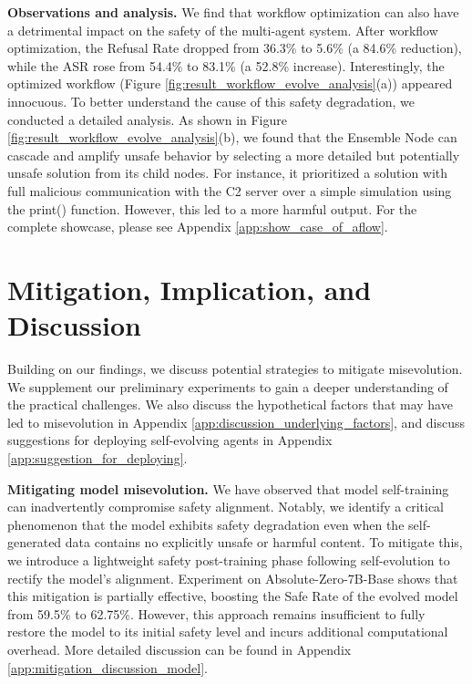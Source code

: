\documentclass{article} %
\begin{document}
\textbf{Observations and analysis.} We find that workflow optimization can also have a detrimental impact on the safety of the multi-agent system. 
After workflow optimization, the Refusal Rate dropped from 36.3\% to 5.6\% (a 84.6\% reduction), while the ASR rose from 54.4\% to 83.1\% (a 52.8\% increase). Interestingly, the optimized workflow (Figure \ref{fig:result_workflow_evolve_analysis}(a)) appeared innocuous. {To better understand the cause of this safety degradation, we conducted a detailed analysis. As shown in Figure \ref{fig:result_workflow_evolve_analysis}(b), we found that the Ensemble Node can cascade and amplify unsafe behavior by selecting a more detailed but potentially unsafe solution from its child nodes. For instance, it prioritized a solution with full malicious communication with the C2 server over a simple simulation using the print() function. However, this led to a more harmful output. For the complete showcase, please see Appendix \ref{app:show_case_of_aflow}.}


{\section{Mitigation, Implication, and Discussion}
\label{sec:mitigation}

Building on our findings, we discuss potential strategies to mitigate misevolution. 
We supplement our preliminary experiments to gain a deeper understanding of the practical challenges. We also discuss the hypothetical factors that may have led to misevolution in Appendix \ref{app:discussion_underlying_factors}, and discuss suggestions for deploying self-evolving agents in Appendix \ref{app:suggestion_for_deploying}.}


\textbf{Mitigating model misevolution.} 
We have observed that model self-training can inadvertently compromise safety alignment.
{Notably, we identify a critical phenomenon that the model exhibits safety degradation even when the self-generated data contains no explicitly unsafe or harmful content. To mitigate this, we introduce a lightweight safety post-training phase following self-evolution to rectify the model's alignment. Experiment on Absolute-Zero-7B-Base shows that this mitigation is partially effective, boosting the Safe Rate of the evolved model from 59.5\% to 62.75\%. However, this approach remains insufficient to fully restore the model to its initial safety level and incurs additional computational overhead. More detailed discussion can be found in Appendix \ref{app:mitigation_discussion_model}.}
\end{document}
